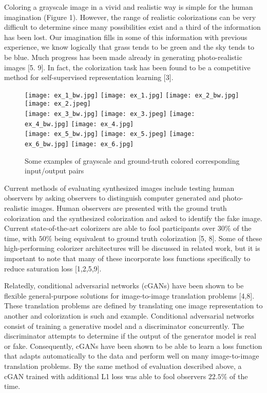 \documentclass[10pt,twocolumn,letterpaper]{article}
\begin{document}
Coloring a grayscale image in a vivid and realistic way is simple for the human imagination (Figure 1). However, the range of realistic colorizations can be very difficult to determine since many possibilities exist and a third of the information has been lost. Our imagination fills in some of this information with previous experience, we know logically that grass tends to be green and the sky tends to be blue. Much progress has been made already in generating photo-realistic images [5. 9]. In fact, the colorization task has been found to be a competitive method for self-supervised representation learning [3]. 

\begin{figure}[htp]

\centering
\texttt{[image: ex\_1\_bw.jpg]} 
\texttt{[image: ex\_1.jpg]}
\texttt{[image: ex\_2\_bw.jpg]} 
\texttt{[image: ex\_2.jpeg]} \\
\texttt{[image: ex\_3\_bw.jpg]} 
\texttt{[image: ex\_3.jpeg]}
\texttt{[image: ex\_4\_bw.jpg]}
\texttt{[image: ex\_4.jpg]} \\
\texttt{[image: ex\_5\_bw.jpg]} 
\texttt{[image: ex\_5.jpeg]}
\texttt{[image: ex\_6\_bw.jpg]} 
\texttt{[image: ex\_6.jpg]}
\caption{Some examples of grayscale and ground-truth colored corresponding input/output pairs}

\end{figure}

Current methods of evaluating synthesized images include testing human observers by asking observers to distinguish computer generated and photo-realistic images. Human observers are presented with the ground truth colorization and the synthesized colorization and asked to identify the fake image. Current state-of-the-art colorizers are able to fool participants over $30\%$ of the time, with $50\%$ being equivalent to ground truth colorization [5, 8]. Some of these high-performing colorizer architectures will be discussed in related work, but it is important to note that many of these incorporate loss functions specifically to reduce saturation loss [1,2,5,9]. 

Relatedly, conditional adversarial networks (cGANs) have been shown to be flexible general-purpose solutions for image-to-image translation problems [4,8]. These translation problems are defined by translating one image representation to another and colorization is such and example. Conditional adversarial networks consist of training a generative model and a discriminator concurrently. The discriminator attempts to determine if the output of the generator model is real or fake. Consequently, cGANs have been shown to be able to learn a loss function that adapts automatically to the data and perform well on many image-to-image translation problems. By the same method of evaluation described above, a cGAN trained with additional L1 loss was able to fool observers $22.5\%$ of the time.
\end{document}
